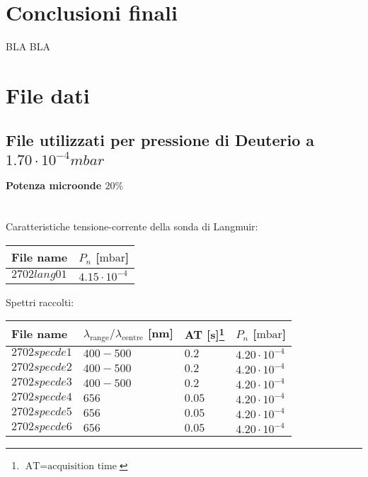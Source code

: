 \section{Conclusioni finali}
BLA BLA

\section{File dati}
\subsection{File utilizzati per pressione di Deuterio a $1.70\cdot10^{-4}mbar$}

\paragraph*{Potenza microonde $\text{20\%}$} ~\\
Caratteristiche tensione-corrente della sonda di Langmuir:
\begin{center}
\begin{tabular}{p{3cm}p{3cm}}
\toprule
File name	&$P_{n}$ [$\si{\milli\bar}$]\\
\midrule
$2702lang01$	&$4.15\cdot10^{-4}$\\
\bottomrule
\end{tabular}
\end{center}

Spettri raccolti:
\begin{center}
\begin{tabular}{p{3cm}p{4cm}p{2cm}p{3cm}}
\toprule
File name	&$\lambda_\text{range}\text{/}\lambda_\text{centre}$ [nm] &AT [s]\footnote{$\text{AT}=\text{acquisition time}$} &$P_{n}$ [$\si{\milli\bar}$]\\
\midrule
$2702specde1$	&$400-500$	&$0.2$		&$4.20\cdot10^{-4}$\\
$2702specde2$	&$400-500$	&$0.2$		&$4.20\cdot10^{-4}$\\
$2702specde3$	&$400-500$	&$0.2$		&$4.20\cdot10^{-4}$\\
$2702specde4$	&$656$		&$0.05$		&$4.20\cdot10^{-4}$\\
$2702specde5$	&$656$		&$0.05$		&$4.20\cdot10^{-4}$\\
$2702specde6$	&$656$		&$0.05$		&$4.20\cdot10^{-4}$\\

\bottomrule
\end{tabular}
\end{center}


